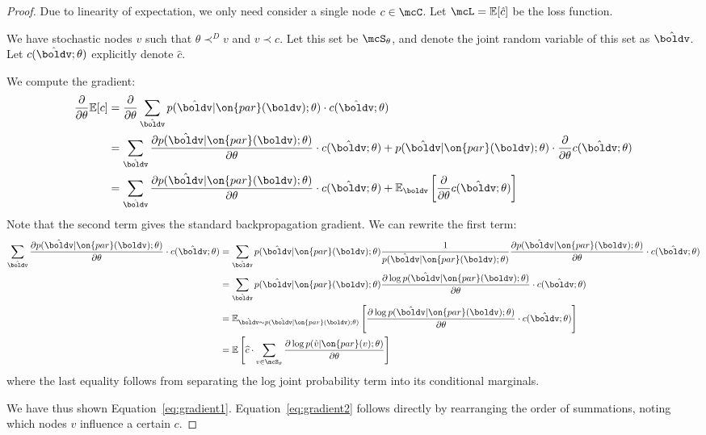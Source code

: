 \documentclass[12pt]{report}
\begin{document}
\begin{proof}
Due to linearity of expectation, we only need consider a single node $c \in \mcC$. Let $\mcL = \mathbb{E}[\hat{c}]$ be the loss function.

We have stochastic nodes $v$ such that $\theta \prec^D v$ and $v \prec c$. Let this set be $\mcS_\theta$, and denote the joint random variable of this set as $\hat{\boldv}$. Let $c(\hat{\boldv} ; \theta)$ explicitly denote $\hat{c}$.

We compute the gradient:
\begin{align*}
\frac{\partial }{\partial \theta}\mathbb{E}[c] &= \frac{\partial}{\partial \theta} \sum_{\hat{\boldv}} p(\hat{\boldv} | \on{par}(\boldv); \theta) \cdot c(\hat{\boldv}; \theta) \\
& = \sum_{\hat{\boldv}} \frac{ \partial  p(\hat{\boldv} | \on{par}(\boldv); \theta) } {\partial \theta} \cdot c(\hat{\boldv} ; \theta) + p(\hat{\boldv} | \on{par}(\boldv); \theta) \cdot \frac{\partial}{\partial\theta} c(\hat{\boldv}; \theta) \\
&= \sum_{\hat{\boldv}} \frac{ \partial  p(\hat{\boldv} | \on{par}(\boldv); \theta) } {\partial \theta} \cdot c(\hat{\boldv} ; \theta) + \mathbb{E}_{\boldv}\left[ \frac{\partial}{\partial\theta} c(\hat{\boldv}; \theta)  \right]
\end{align*}
Note that the second term gives the standard backpropagation gradient. We can rewrite the first term:
\begin{align*}
\sum_{\hat{\boldv}} \frac{ \partial  p(\hat{\boldv} | \on{par}(\boldv); \theta) } {\partial \theta} \cdot c(\hat{\boldv} ; \theta)
&= \sum_{\hat{\boldv}} p(\hat{\boldv} | \on{par}(\boldv); \theta) \frac{1}{p(\hat{\boldv}|\on{par}(\boldv);\theta)}\frac{ \partial  p(\hat{\boldv} | \on{par}(\boldv); \theta) } {\partial \theta} \cdot c(\hat{\boldv}; \theta) \\
&= \sum_{\hat{\boldv}} p(\hat{\boldv} | \on{par}(\boldv); \theta) \frac{ \partial  \log p(\hat{\boldv} | \on{par}(\boldv); \theta) } {\partial \theta} \cdot c(\hat{\boldv}; \theta) \\
 &= \mathbb{E}_{\hat{\boldv} \sim p(\hat{\boldv} | \on{par}(\boldv); \theta)} \left[ \frac{ \partial  \log p(\hat{\boldv} | \on{par}(\boldv); \theta) } {\partial \theta} \cdot c(\hat{\boldv} ; \theta) \right] \\
&= \mathbb{E}\left[ \widehat{c} \cdot \sum_{v \in \mcS_\theta} \frac{  \partial  \log p(\hat{v} | \on{par}(v); \theta) } {\partial \theta}  \right]
\end{align*}
where the last equality follows from separating the log joint probability term into its conditional marginals.

We have thus shown Equation~\ref{eq:gradient1}. Equation~\ref{eq:gradient2} follows directly by rearranging the order of summations, noting which nodes $v$ influence a certain $c$.

\end{proof}
\end{document}
